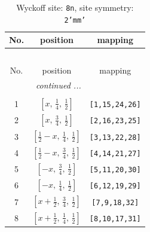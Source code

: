\documentclass[fleqn,8pt]{jsarticle}
\begin{document}
\begin{longtable}{ccc}
\caption{Wyckoff site: {\tt 8n}, site symmetry: {\tt 2'mm'}}
 \\
 \hline \hline
No. & position & mapping \\ \hline \endfirsthead

\multicolumn{2}{l}{\tablename\ \thetable{}} \\
 \hline \hline
No. & position & mapping \\ \hline \endhead

 \hline \hline
\multicolumn{2}{r}{\footnotesize\it continued ...} \\ \endfoot

 \hline \hline
\multicolumn{2}{r}{} \\ \endlastfoot

1 & $\left[ x,\, \frac{1}{4},\, \frac{1}{2} \right]$ & {\tt [1,15,24,26]} \\ \hline
2 & $\left[ x,\, \frac{3}{4},\, \frac{1}{2} \right]$ & {\tt [2,16,23,25]} \\ \hline
3 & $\left[ \frac{1}{2} - x,\, \frac{1}{4},\, \frac{1}{2} \right]$ & {\tt [3,13,22,28]} \\ \hline
4 & $\left[ \frac{1}{2} - x,\, \frac{3}{4},\, \frac{1}{2} \right]$ & {\tt [4,14,21,27]} \\ \hline
5 & $\left[ - x,\, \frac{3}{4},\, \frac{1}{2} \right]$ & {\tt [5,11,20,30]} \\ \hline
6 & $\left[ - x,\, \frac{1}{4},\, \frac{1}{2} \right]$ & {\tt [6,12,19,29]} \\ \hline
7 & $\left[ x + \frac{1}{2},\, \frac{3}{4},\, \frac{1}{2} \right]$ & {\tt [7,9,18,32]} \\ \hline
8 & $\left[ x + \frac{1}{2},\, \frac{1}{4},\, \frac{1}{2} \right]$ & {\tt [8,10,17,31]} \\
\end{longtable}
\renewcommand{\arraystretch}{1.2}
\end{document}
